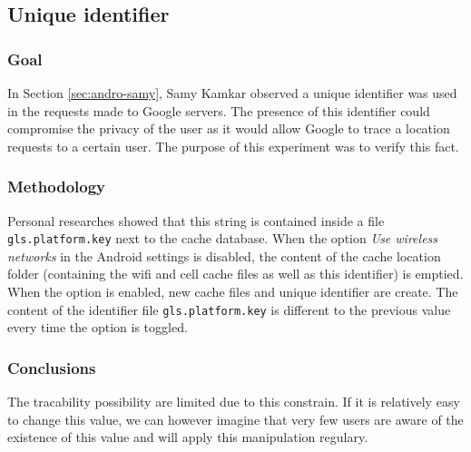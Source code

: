 \subsection{Unique identifier}

\subsubsection{Goal}

In Section \ref{sec:andro-samy}, Samy Kamkar observed a unique identifier was used in the requests made to Google servers.
The presence of this identifier could compromise the privacy of the user as it would allow Google to trace a location requests to a certain user.
The purpose of this experiment was to verify this fact.

\subsubsection{Methodology}

Personal researches showed that this string is contained inside a file \texttt{gls.platform.key} next to the cache database.
When the option \emph{Use wireless networks} in the Android settings is disabled, the content of the cache location folder (containing the wifi and cell cache files as well as this identifier) is emptied.
When the option is enabled, new cache files and unique identifier are create.
The content of the identifier file \texttt{gls.platform.key} is different to the previous value every time the option is toggled.

\subsubsection{Conclusions}

The tracability possibility are limited due to this constrain.
If it is relatively easy to change this value, we can however imagine that very few users are aware of the existence of this value and will apply this manipulation regulary.



